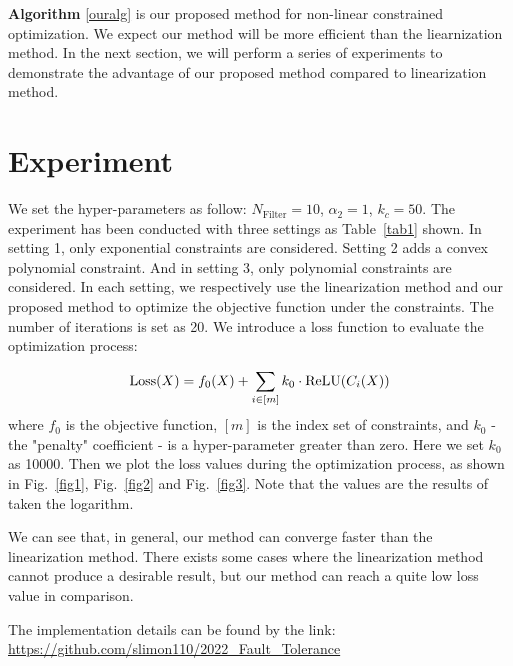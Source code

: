 \documentclass[conference]{IEEEtran}
\begin{document}
\textbf{Algorithm} \ref{ouralg} is our proposed method for non-linear constrained optimization. We expect our method will be more efficient than the liearnization method. In the next section, we will perform a series of experiments to demonstrate the advantage of our proposed method compared to linearization method.

\section{Experiment}
We set the hyper-parameters as follow: $N_{\text{Filter}} = 10$, $\alpha_2 = 1$, $k_{c} = 50$.
The experiment has been conducted with three settings as Table~\ref{tab1} shown. In setting 1, only exponential constraints are considered. Setting 2 adds a convex polynomial constraint. And in setting 3, only polynomial constraints are considered. In each setting, we respectively use the linearization method and our proposed method to optimize the objective function under the constraints. The number of iterations is set as 20. We introduce a loss function to evaluate the optimization process:

\begin{equation*}
    \text{Loss}(X) = f_{0}(X) + \sum_{i \in [m]} k_0 \cdot \text{ReLU}(C_{i}(X)) \\
\end{equation*}
where $f_{0}$ is the objective function, $[m]$ is the index set of constraints, and $k_0$ - the "penalty" coefficient - is a hyper-parameter greater than zero. Here we set $k_0$ as 10000. Then we plot the loss values during the optimization process, as shown in Fig.~\ref{fig1}, Fig.~\ref{fig2} and Fig.~\ref{fig3}. Note that the values are the results of taken the logarithm.

We can see that, in general, our method can converge faster than the linearization method. There exists some cases where the linearization method cannot produce a desirable result, but our method can reach a quite low loss value in comparison.

The implementation details can be found by the link: \url{https://github.com/slimon110/2022_Fault_Tolerance}
\end{document}
